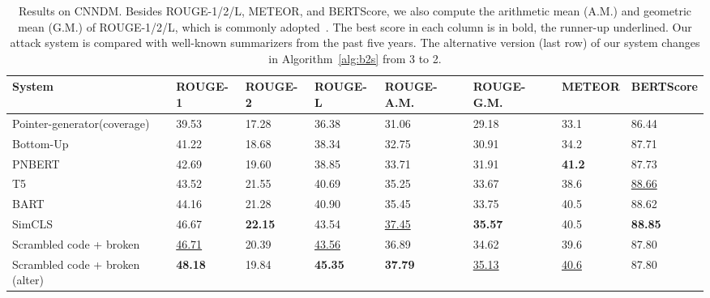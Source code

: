 \documentclass[11pt]{article}
\theoremstyle{remark}
\begin{document}
\begin{table*}[t]
\scriptsize
\begin{tabular}{llllllll}
\hline
System                                        & ROUGE-1 & ROUGE-2 & ROUGE-L & ROUGE-A.M. & ROUGE-G.M. & METEOR & BERTScore \\
\hline
Pointer-generator(coverage)~\cite{see-etal-2017-get} & 39.53   & 17.28   & 36.38   & 31.06    & 29.18    & 33.1  & 86.44    \\
Bottom-Up~\cite{gehrmann-etal-2018-bottom}           & 41.22   & 18.68   & 38.34   & 32.75    & 30.91    & 34.2  & 87.71    \\
PNBERT~\cite{zhong-etal-2019-searching}             & 42.69   & 19.60   & 38.85   & 33.71    & 31.91    & \textbf{41.2}  & 87.73    \\
T5~\cite{raffel2019exploring}                 & 43.52   & 21.55   & 40.69   & 35.25    & 33.67    & 38.6  & \underline{88.66}    \\
BART~\cite{lewis-etal-2020-bart}                     & 44.16   & 21.28   & 40.90   & 35.45    & 33.75    & 40.5  & 88.62    \\
SimCLS~\cite{liu-liu-2021-simcls}                   & 46.67   & \textbf{22.15}   & 43.54   & \underline{37.45}    & \textbf{35.57}    & 40.5  & \textbf{88.85}    \\
\hline
Scrambled code + broken                       & \underline{46.71}   & 20.39   & \underline{43.56}   & 36.89    & 34.62    & 39.6  & 87.80     \\
Scrambled code + broken   (alter)             & \textbf{48.18}   & 19.84   & \textbf{45.35}   & \textbf{37.79}    & \underline{35.13}    & \underline{40.6}  & 87.80    \\
\hline
\end{tabular}
\caption{Results on CNNDM. Besides ROUGE-1/2/L, METEOR, and BERTScore, we also compute the arithmetic mean (A.M.) and geometric mean (G.M.) of ROUGE-1/2/L, which is commonly adopted~\cite{zhang-etal-2019-pretraining,bae-etal-2019-summary,chowdhery2022palm}. The best score in each column is in bold, the runner-up underlined. Our attack system is compared with well-known summarizers from the past five years. The alternative version (last row) of our system changes  in Algorithm~\ref{alg:b2s} from 3 to 2.}
\label{tab:result}
\end{table*}
\end{document}

